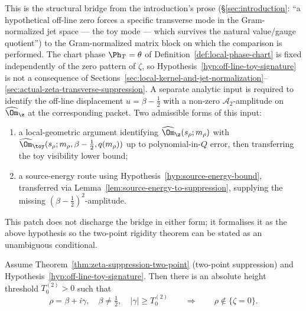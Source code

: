 \begin{remark}
\label{rem:off-line-toy-signature-status}
This is the structural bridge from the introduction's prose
(\S\ref{sec:introduction}: ``a hypothetical off-line zero forces a
specific transverse mode in the Gram-normalized jet space --- the toy
mode --- which survives the natural value/gauge quotient'') to the
Gram-normalized matrix block on which the comparison is performed.
The chart phase \(\Ph_T=\theta\) of
Definition~\ref{def:local-phase-chart} is fixed independently of the
zero pattern of \(\zeta\), so
Hypothesis~\ref{hyp:off-line-toy-signature} is not a consequence of
Sections~\ref{sec:local-kernel-and-jet-normalization}--\ref{sec:actual-zeta-transverse-suppression}.
A separate analytic input is required to identify the off-line
displacement \(u=\beta-\tfrac12\) with a non-zero \(\mathcal A_2\)-amplitude
on \(\widehat\Om_\z\) at the corresponding packet.  Two admissible
forms of this input:
\begin{enumerate}[label=\textup{(\roman*)},leftmargin=*]
\item a local-geometric argument identifying
      \(\widehat\Om_\z(s_\rho;m_\rho)\) with
      \(\widehat\Om_\toy(s_\rho;m_\rho,\beta-\tfrac12,q(m_\rho))\) up
      to polynomial-in-\(Q\) error, then transferring the toy
      visibility lower bound;
\item a source-energy route using
      Hypothesis~\ref{hyp:source-energy-bound}, transferred via
      Lemma~\ref{lem:source-energy-to-suppression}, supplying the
      missing \((\beta-\tfrac12)^2\)-amplitude.
\end{enumerate}
This patch does not discharge the bridge in either form; it formalises
it as the above hypothesis so the two-point rigidity theorem can be
stated as an unambiguous conditional.
\end{remark}

\begin{theorem}
\label{thm:two-point-rigidity}
Assume Theorem~\ref{thm:zeta-suppression-two-point} (two-point
suppression) and Hypothesis~\ref{hyp:off-line-toy-signature}.  Then
there is an absolute height threshold \(T_0^{(2)}>0\) such that
\begin{equation}
\label{eq:two-point-rigidity}
        \rho=\beta+i\gamma,
        \quad \beta\ne\tfrac12,
        \quad |\gamma|\ge T_0^{(2)}
        \qquad\Longrightarrow\qquad
        \rho\notin\{\zeta=0\}.
\end{equation}
\end{theorem}

